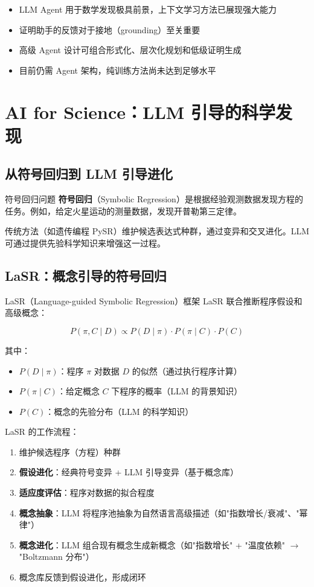 \documentclass[a4paper]{article}
\begin{document}
\begin{itemize}
    \item LLM Agent 用于数学发现极具前景，上下文学习方法已展现强大能力
    \item 证明助手的反馈对于接地（grounding）至关重要
    \item 高级 Agent 设计可组合形式化、层次化规划和低级证明生成
    \item 目前仍需 Agent 架构，纯训练方法尚未达到足够水平
\end{itemize}

\section{AI for Science：LLM 引导的科学发现}

\subsection{从符号回归到 LLM 引导进化}

\begin{knowledgebox}{符号回归问题}
\textbf{符号回归}（Symbolic Regression）是根据经验观测数据发现方程的任务。例如，给定火星运动的测量数据，发现开普勒第三定律。

传统方法（如遗传编程 PySR）维护候选表达式种群，通过变异和交叉进化。LLM 可通过提供先验科学知识来增强这一过程。
\end{knowledgebox}

\subsection{LaSR：概念引导的符号回归}

\begin{importantbox}{LaSR（Language-guided Symbolic Regression）框架}
LaSR 联合推断程序假设和高级概念：

$$P(\pi, C \mid D) \propto P(D \mid \pi) \cdot P(\pi \mid C) \cdot P(C)$$

其中：
\begin{itemize}
    \item $P(D \mid \pi)$：程序 $\pi$ 对数据 $D$ 的似然（通过执行程序计算）
    \item $P(\pi \mid C)$：给定概念 $C$ 下程序的概率（LLM 的背景知识）
    \item $P(C)$：概念的先验分布（LLM 的科学知识）
\end{itemize}
\end{importantbox}

LaSR 的工作流程：
\begin{enumerate}
    \item 维护候选程序（方程）种群
    \item \textbf{假设进化}：经典符号变异 + LLM 引导变异（基于概念库）
    \item \textbf{适应度评估}：程序对数据的拟合程度
    \item \textbf{概念抽象}：LLM 将程序池抽象为自然语言高级描述（如"指数增长/衰减"、"幂律"）
    \item \textbf{概念进化}：LLM 组合现有概念生成新概念（如"指数增长" + "温度依赖" $\to$ "Boltzmann 分布"）
    \item 概念库反馈到假设进化，形成闭环
\end{enumerate}
\end{document}
